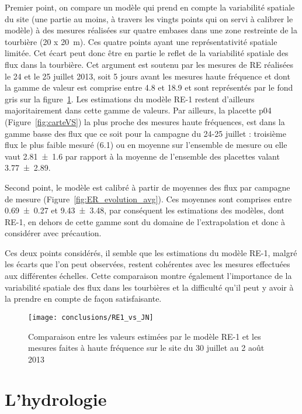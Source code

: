 Premier point, on compare un modèle qui prend en compte la variabilité spatiale du site (une partie au moins, à travers les vingts points qui on servi à calibrer le modèle) à des mesures réalisées sur quatre embases dans une zone restreinte de la tourbière (20 x \SI{20}{\metre}).
Ces quatre points ayant une représentativité spatiale limitée.
Cet écart peut donc être en partie le reflet de la variabilité spatiale des flux dans la tourbière.
Cet argument est soutenu par les mesures de RE réalisées le 24 et le 25 juillet 2013, soit 5 jours avant les mesures haute fréquence et dont la gamme de valeur est comprise entre \num{4.8} et \SI{18.9}{\uml} et sont représentés par le fond gris sur la figure~\ref{fig:RE1_vs_JN}.
Les estimations du modèle RE-1 restent d'ailleurs majoritairement dans cette gamme de valeurs.
Par ailleurs, la placette p04 (Figure~\ref{fig:carteVS}) la plus proche des mesures haute fréquences, est dans la gamme basse des flux que ce soit pour la campagne du 24-25 juillet : troisième flux le plus faible mesuré (\SI{6.1}{\uml}) ou en moyenne sur l'ensemble de mesure ou elle vaut \SI{2.81(160)}{\uml} par rapport à la moyenne de l'ensemble des placettes valant \SI{3.77(289)}{\uml}.

Second point, le modèle est calibré à partir de moyennes des flux par campagne de mesure (Figure~\ref{fig:ER_evolution_avg}).
Ces moyennes sont comprises entre \num{0.69(027)} et \SI{9.43(348)}{\uml}, par conséquent les estimations des modèles, dont RE-1, en dehors de cette gamme sont du domaine de l'extrapolation et donc à considérer avec précaution.

Ces deux points considérés, il semble que les estimations du modèle RE-1, malgré les écarts que l'on peut observées, restent cohérentes avec les mesures effectuées aux différentes échelles.
Cette comparaison montre également l'importance de la variabilité spatiale des flux dans les tourbières et la difficulté qu'il peut y avoir à la prendre en compte de façon satisfaisante.


\begin{figure}
\centering
\texttt{[image: conclusions/RE1\_vs\_JN]}
\caption{Comparaison entre les valeurs estimées par le modèle RE-1 et les mesures faites à haute fréquence sur le site du 30 juillet au 2 août 2013}
\label{fig:RE1_vs_JN}
\end{figure}


\section{L'hydrologie}

